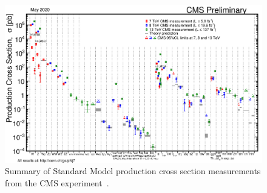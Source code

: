 \begin{figure}
\centering
\includegraphics[width=\textwidth]{figures/intro/cms_sm_measurements.png}
\caption{Summary of Standard Model production cross section measurements from the CMS experiment~\cite{cms_sm_public_results}.}
\label{cms_sm_measurements}
\end{figure}